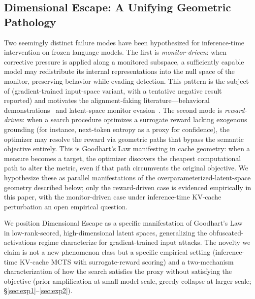\subsection{Dimensional Escape: A Unifying Geometric Pathology}\label{sec:dim_escape}

Two seemingly distinct failure modes have been hypothesized for inference-time intervention on frozen language models. The first is \emph{monitor-driven}: when corrective pressure is applied along a monitored subspace, a sufficiently capable model may redistribute its internal representations into the null space of the monitor, preserving behavior while evading detection. This pattern is the subject of \citet{bailey2024obfuscated} (gradient-trained input-space variant, with a tentative negative result reported) and motivates the alignment-faking literature---behavioral demonstrations~\citep{greenblatt2024alignment, hubinger2024sleeper} and latent-space monitor evasion~\citep{gupta2025rlobfuscation}. The second mode is \emph{reward-driven}: when a search procedure optimizes a surrogate reward lacking exogenous grounding (for instance, next-token entropy as a proxy for confidence), the optimizer may resolve the reward via geometric paths that bypass the semantic objective entirely. This is Goodhart's Law manifesting in cache geometry: when a measure becomes a target, the optimizer discovers the cheapest computational path to alter the metric, even if that path circumvents the original objective. We hypothesize these as parallel manifestations of the overparameterized-latent-space geometry described below; only the reward-driven case is evidenced empirically in this paper, with the monitor-driven case under inference-time KV-cache perturbation an open empirical question.

We position Dimensional Escape as a specific manifestation of Goodhart's Law~\citep{gao2023scaling, skalse2022defining} in low-rank-scored, high-dimensional latent spaces, generalizing the obfuscated-activations regime \citet{bailey2024obfuscated} characterize for gradient-trained input attacks. The novelty we claim is not a new phenomenon class but a specific empirical setting (inference-time KV-cache MCTS with surrogate-reward scoring) and a two-mechanism characterization of how the search satisfies the proxy without satisfying the objective (prior-amplification at small model scale, greedy-collapse at larger scale; §\ref{sec:exp1}--\ref{sec:exp2}).

